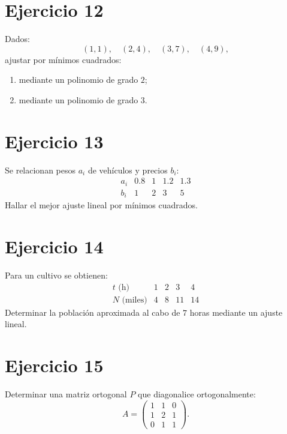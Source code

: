 \documentclass[11pt,a4paper]{article}
\begin{document}
\section{Ejercicio 12}
Dados:
\[
(1,1),\quad(2,4),\quad(3,7),\quad(4,9),
\]
ajustar por mínimos cuadrados:
\begin{enumerate}[label=\alph*)]
\item mediante un polinomio de grado $2$;
\item mediante un polinomio de grado $3$.
\end{enumerate}

\section{Ejercicio 13}
Se relacionan pesos $a_i$ de vehículos y precios $b_i$:
\[
\begin{array}{c|cccc}
a_i&0.8&1&1.2&1.3\\
\hline
b_i&1&2&3&5
\end{array}
\]
Hallar el mejor ajuste lineal por mínimos cuadrados.

\section{Ejercicio 14}
Para un cultivo se obtienen:
\[
\begin{array}{c|cccc}
t\text{ (h)}&1&2&3&4\\
\hline
N\text{ (miles)}&4&8&11&14
\end{array}
\]
Determinar la población aproximada al cabo de $7$ horas mediante un ajuste lineal.

\section{Ejercicio 15}
Determinar una matriz ortogonal $P$ que diagonalice ortogonalmente:
\[
A=
\begin{pmatrix}
1&1&0\\
1&2&1\\
0&1&1
\end{pmatrix}.
\]
\end{document}
